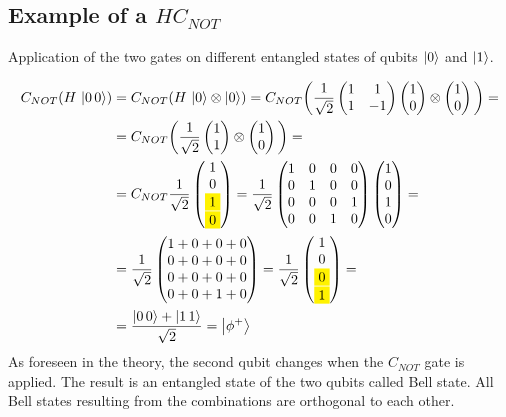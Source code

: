 	\subsection{Example of a $HC_{NOT}$}
	Application of the two gates on different entangled states of qubits $\ket{0}$ and $\ket{1}$.

	\begin{align*}
		C_{NOT}(H\,\ket{0\,0})&=C_{NOT}(H\,\ket{0}\otimes\ket{0})=C_{NOT}\bigg(\frac{1}{\sqrt{2}}\begin{pmatrix}1&1\\1&-1\end{pmatrix}\begin{pmatrix}1\\0\end{pmatrix}\otimes\begin{pmatrix}1\\0\end{pmatrix}\bigg)=\\
													&=C_{NOT}\bigg(\frac{1}{\sqrt{2}}\begin{pmatrix}1\\1\end{pmatrix}\otimes\begin{pmatrix}1\\0\end{pmatrix}\bigg)=\\
													&=C_{NOT}\frac{1}{\sqrt{2}}\begin{pmatrix}1\\0\\\mathcolorbox{yellow}{1}\\\mathcolorbox{yellow}{0}\end{pmatrix}=\frac{1}{\sqrt{2}}\begin{pmatrix}1&0&0&0\\0&1&0&0\\0&0&0&1\\0&0&1&0\end{pmatrix}\begin{pmatrix}1\\0\\1\\0\end{pmatrix}=\\
													&=\frac{1}{\sqrt{2}}\begin{pmatrix}1+0+0+0\\0+0+0+0\\0+0+0+0\\0+0+1+0\end{pmatrix}=\frac{1}{\sqrt{2}}\begin{pmatrix}1\\0\\\mathcolorbox{yellow}{0}\\\mathcolorbox{yellow}{1}\end{pmatrix}=\\
													&=\frac{\ket{0\,0}+\ket{1\,1}}{\sqrt{2}}=\ket{\phi^+}
	\end{align*}
	As foreseen in the theory, the second qubit changes when the $C_{NOT}$ gate is applied.
	The result is an entangled state of the two qubits called Bell state.
	All Bell states resulting from the combinations are orthogonal to each other.

